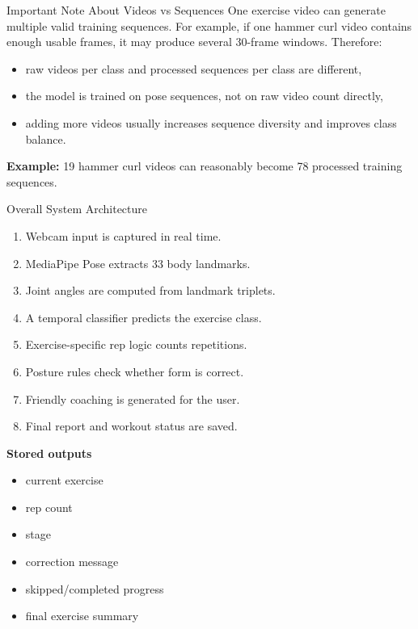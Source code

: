 \documentclass[aspectratio=169]{beamer}
\begin{document}
\begin{frame}{Important Note About Videos vs Sequences}
\justifying
One exercise video can generate multiple valid training sequences. For example, if one hammer curl video contains enough usable frames, it may produce several 30-frame windows. Therefore:

\begin{itemize}
  \item raw videos per class and processed sequences per class are different,
  \item the model is trained on pose sequences, not on raw video count directly,
  \item adding more videos usually increases sequence diversity and improves class balance.
\end{itemize}

\vspace{0.3cm}
\textbf{Example:} 19 hammer curl videos can reasonably become 78 processed training sequences.
\end{frame}

\begin{frame}{Overall System Architecture}
\small
\begin{enumerate}
  \item Webcam input is captured in real time.
  \item MediaPipe Pose extracts 33 body landmarks.
  \item Joint angles are computed from landmark triplets.
  \item A temporal classifier predicts the exercise class.
  \item Exercise-specific rep logic counts repetitions.
  \item Posture rules check whether form is correct.
  \item Friendly coaching is generated for the user.
  \item Final report and workout status are saved.
\end{enumerate}

\vspace{0.3cm}
\textbf{Stored outputs}
\begin{itemize}
  \item current exercise
  \item rep count
  \item stage
  \item correction message
  \item skipped/completed progress
  \item final exercise summary
\end{itemize}
\end{frame}
\end{document}

